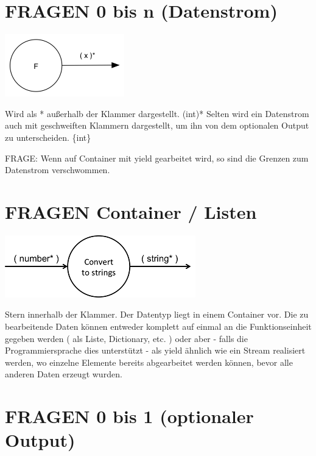 \documentclass[a4paper,12pt,oneside]{book}
\begin{document}
\section{FRAGEN 0 bis n (Datenstrom)}
\label{sec-3-4}

\includegraphics[width=.9\linewidth]{./img/diagram0n.png}

Wird als * außerhalb der Klammer dargestellt.
(int)*
Selten wird ein Datenstrom auch mit geschweiften Klammern dargestellt, um ihn von dem optionalen Output zu unterscheiden.
\{int\}

FRAGE: Wenn auf Container mit yield gearbeitet wird, so sind die Grenzen zum
Datenstrom verschwommen.
\section{FRAGEN Container / Listen}
\label{sec-3-5}

\includegraphics[width=.9\linewidth]{./img/diagramCollection.png}

Stern innerhalb der Klammer.
Der Datentyp liegt in einem Container vor.
Die zu bearbeitende Daten können entweder komplett auf einmal an die Funktionseinheit gegeben werden ( als Liste, Dictionary, etc. )
oder aber - falls die Programmiersprache dies unterstützt - als yield ähnlich
wie ein Stream realisiert werden, wo einzelne Elemente bereits abgearbeitet werden
können, bevor alle anderen Daten erzeugt wurden.

\section{FRAGEN 0 bis 1 (optionaler Output)}
\label{sec-3-6}
\end{document}
